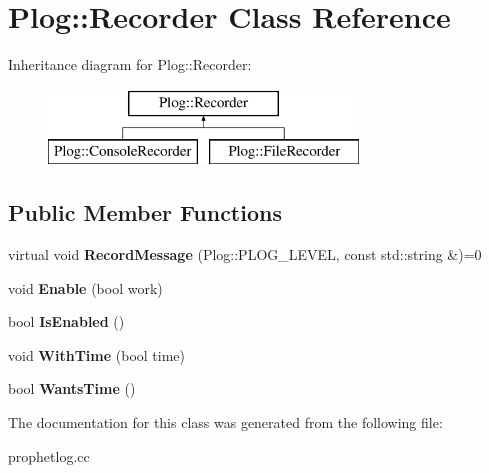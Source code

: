\hypertarget{classPlog_1_1Recorder}{
\section{Plog::Recorder Class Reference}
\label{classPlog_1_1Recorder}
}
Inheritance diagram for Plog::Recorder:\begin{figure}[H]
\begin{center}
\leavevmode
\includegraphics[height=2cm]{classPlog_1_1Recorder}
\end{center}
\end{figure}
\subsection*{Public Member Functions}
\begin{DoxyCompactItemize}
\item 
\hypertarget{classPlog_1_1Recorder_a9c049eccb4393f255881ffa8b80cb98c}{
virtual void {\bfseries RecordMessage} (Plog::PLOG\_\-LEVEL, const std::string \&)=0}
\label{classPlog_1_1Recorder_a9c049eccb4393f255881ffa8b80cb98c}

\item 
\hypertarget{classPlog_1_1Recorder_a6337130ba46fcf60fedb55de9cb5ce96}{
void {\bfseries Enable} (bool work)}
\label{classPlog_1_1Recorder_a6337130ba46fcf60fedb55de9cb5ce96}

\item 
\hypertarget{classPlog_1_1Recorder_a2b75e0a31d40f4376f942e54fef339e5}{
bool {\bfseries IsEnabled} ()}
\label{classPlog_1_1Recorder_a2b75e0a31d40f4376f942e54fef339e5}

\item 
\hypertarget{classPlog_1_1Recorder_a78f446727f7ff5ba803e4a1f3be6a736}{
void {\bfseries WithTime} (bool time)}
\label{classPlog_1_1Recorder_a78f446727f7ff5ba803e4a1f3be6a736}

\item 
\hypertarget{classPlog_1_1Recorder_aa7df41ab647abbef5d74e1130dd0b483}{
bool {\bfseries WantsTime} ()}
\label{classPlog_1_1Recorder_aa7df41ab647abbef5d74e1130dd0b483}

\end{DoxyCompactItemize}


The documentation for this class was generated from the following file:\begin{DoxyCompactItemize}
\item 
prophetlog.cc\end{DoxyCompactItemize}
